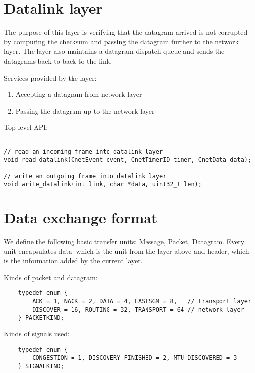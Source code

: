 \documentclass[11pt,a4paper,oneside]{report}
\begin{document}
            
\section*{Datalink layer} 
The purpose of this layer is verifying that the datagram arrived is not
corrupted by computing the checksum and passing the datagram further to
the network layer. The layer also maintains a datagram dispatch queue 
and sends the datagrams back to back to the link.
    
    Services provided by the layer:
    \begin{enumerate}
      \item Accepting a datagram from network layer
      \item Passing the datagram up to the network layer 
    \end{enumerate}
    \newpage
    Top level API: 
  \begin{lstlisting}

// read an incoming frame into datalink layer
void read_datalink(CnetEvent event, CnetTimerID timer, CnetData data);

// write an outgoing frame into datalink layer
void write_datalink(int link, char *data, uint32_t len);

  \end{lstlisting} 
 
\section*{Data exchange format}

We define the following basic transfer units: Message, Packet, Datagram.
Every unit encapsulates data, which is the unit from the layer above and header, 
which is the information added by the current layer. 

Kinds of packet and datagram:

    \begin{lstlisting}
    typedef enum {
        ACK = 1, NACK = 2, DATA = 4, LASTSGM = 8,   // transport layer
        DISCOVER = 16, ROUTING = 32, TRANSPORT = 64 // network layer
    } PACKETKIND;
    \end{lstlisting}
    
Kinds of signals used:

    \begin{lstlisting}
    typedef enum {
        CONGESTION = 1, DISCOVERY_FINISHED = 2, MTU_DISCOVERED = 3
    } SIGNALKIND;
    \end{lstlisting}
\end{document}
